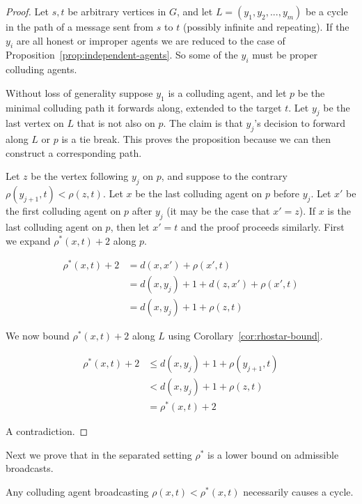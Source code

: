 \documentclass{comnet}
\providecommand{\DIFadd}[1]{{\protect\color{blue}\uwave{#1}}} %
\providecommand{\DIFdel}[1]{{\protect\color{red}\sout{#1}}}                      %
\providecommand{\DIFaddbegin}{} %
\providecommand{\DIFaddend}{} %
\providecommand{\DIFdelbegin}{} %
\providecommand{\DIFdelend}{} %
\begin{document}
\begin{proof}

Let $s,t$ be arbitrary vertices in $G$, and let \DIFdelbegin \DIFdel{$L = (y_1, y_2, ..., y_m)$ }\DIFdelend \DIFaddbegin \DIFadd{$L = (y_1, y_2, \dots, y_m)$ }\DIFaddend be
a cycle in the path of a message sent from $s$ to $t$ (possibly infinite and
repeating). If the $y_i$ are all honest or improper agents we are reduced to
the case of Proposition~\ref{prop:independent-agents}. So some of the $y_i$
must be proper colluding agents. 

Without loss of generality suppose $y_1$ is a colluding agent, and let $p$ be
the minimal colluding path it forwards along, extended to the target $t$.  Let
$y_j$ be the last vertex on $L$ that is not also on $p$. The claim is that
$y_j$'s decision to forward along $L$ or $p$ is a tie break. This proves the
proposition because we can then construct a corresponding path. 

Let $z$ be the vertex following $y_j$ on $p$, and suppose to the contrary
$\rho(y_{j+1}, t) < \rho(z,t)$. Let $x$ be the last colluding agent on $p$
before $y_j$. Let $x'$ be the first colluding agent on $p$ after $y_j$ (it may
be the case that $x' = z$). If $x$ is the last colluding agent on $p$, then let
$x'=t$ and the proof proceeds similarly. First we expand $\rho^*(x,t) + 2$
along $p$.

\begin{align*}
   \rho^*(x,t) + 2 &= d(x,x') + \rho(x',t) \\  
                   &= d(x,y_j) + 1 + d(z,x') + \rho(x',t) \\
                   &= d(x,y_j) + 1 + \rho(z,t)
\end{align*}

We now bound $\rho^*(x,t) + 2$ along $L$ using
Corollary~\ref{cor:rhostar-bound}. 

\begin{align*}
   \rho^*(x,t) + 2 &\leq d(x, y_j) + 1 + \rho(y_{j+1}, t) \\  
                   &< d(x, y_j) + 1 + \rho(z,t) \\ 
                   &= \rho^*(x,t) + 2
\end{align*}

A contradiction.
\end{proof}

Next we prove that in the separated setting $\rho^*$ is a lower bound on
admissible broadcasts. 

\begin{proposition} \label{prop:rhostar-lower-bound}

Any colluding agent broadcasting $\rho(x,t) < \rho^*(x,t)$ necessarily causes a
cycle.

\end{proposition}
\end{document}

